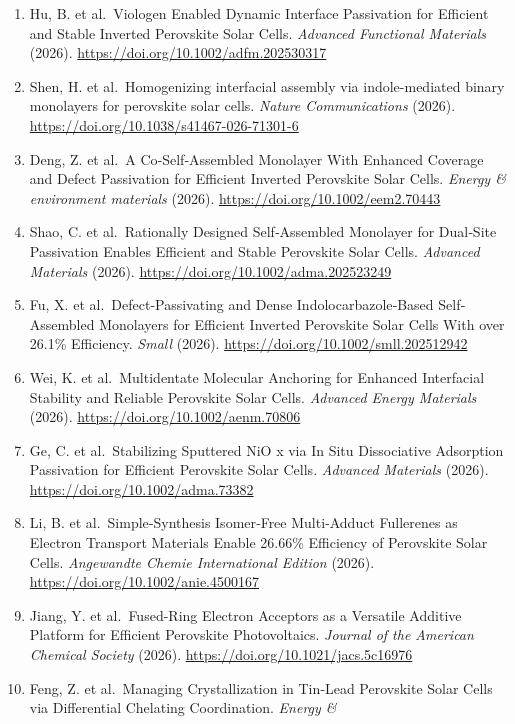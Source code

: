 \documentclass[
  11pt,
]{article}
\begin{document}
\begin{enumerate}
\item
  Hu, B. et al.~Viologen Enabled Dynamic Interface Passivation for
  Efficient and Stable Inverted Perovskite Solar Cells. \emph{Advanced
  Functional Materials} (2026).
  \url{https://doi.org/10.1002/adfm.202530317}
\item
  Shen, H. et al.~Homogenizing interfacial assembly via indole-mediated
  binary monolayers for perovskite solar cells. \emph{Nature
  Communications} (2026).
  \url{https://doi.org/10.1038/s41467-026-71301-6}
\item
  Deng, Z. et al.~A Co‐Self‐Assembled Monolayer With Enhanced Coverage
  and Defect Passivation for Efficient Inverted Perovskite Solar Cells.
  \emph{Energy \& environment materials} (2026).
  \url{https://doi.org/10.1002/eem2.70443}
\item
  Shao, C. et al.~Rationally Designed Self‐Assembled Monolayer for
  Dual‐Site Passivation Enables Efficient and Stable Perovskite Solar
  Cells. \emph{Advanced Materials} (2026).
  \url{https://doi.org/10.1002/adma.202523249}
\item
  Fu, X. et al.~Defect‐Passivating and Dense Indolocarbazole‐Based
  Self‐Assembled Monolayers for Efficient Inverted Perovskite Solar
  Cells With over 26.1\% Efficiency. \emph{Small} (2026).
  \url{https://doi.org/10.1002/smll.202512942}
\item
  Wei, K. et al.~Multidentate Molecular Anchoring for Enhanced
  Interfacial Stability and Reliable Perovskite Solar Cells.
  \emph{Advanced Energy Materials} (2026).
  \url{https://doi.org/10.1002/aenm.70806}
\item
  Ge, C. et al.~Stabilizing Sputtered NiO x via In Situ Dissociative
  Adsorption Passivation for Efficient Perovskite Solar Cells.
  \emph{Advanced Materials} (2026).
  \url{https://doi.org/10.1002/adma.73382}
\item
  Li, B. et al.~Simple‐Synthesis Isomer‐Free Multi‐Adduct Fullerenes as
  Electron Transport Materials Enable 26.66\% Efficiency of Perovskite
  Solar Cells. \emph{Angewandte Chemie International Edition} (2026).
  \url{https://doi.org/10.1002/anie.4500167}
\item
  Jiang, Y. et al.~Fused-Ring Electron Acceptors as a Versatile Additive
  Platform for Efficient Perovskite Photovoltaics. \emph{Journal of the
  American Chemical Society} (2026).
  \url{https://doi.org/10.1021/jacs.5c16976}
\item
  Feng, Z. et al.~Managing Crystallization in Tin‐Lead Perovskite Solar
  Cells via Differential Chelating Coordination. \emph{Energy \&
}
\end{enumerate}
\end{document}
